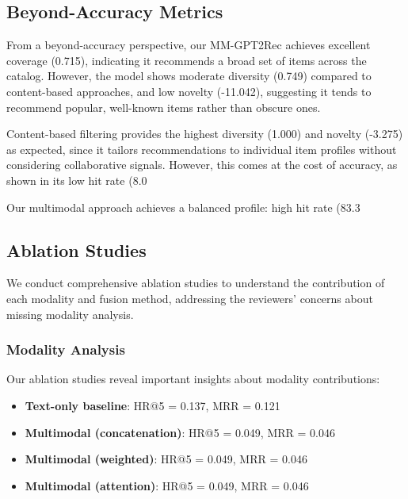 \documentclass[conference]{IEEEtran}
\begin{document}
\subsection{Beyond-Accuracy Metrics}
From a beyond-accuracy perspective, our MM-GPT2Rec achieves excellent coverage (0.715), indicating it recommends a broad set of items across the catalog. However, the model shows moderate diversity (0.749) compared to content-based approaches, and low novelty (-11.042), suggesting it tends to recommend popular, well-known items rather than obscure ones.

Content-based filtering provides the highest diversity (1.000) and novelty (-3.275) as expected, since it tailors recommendations to individual item profiles without considering collaborative signals. However, this comes at the cost of accuracy, as shown in its low hit rate (8.0%

Our multimodal approach achieves a balanced profile: high hit rate (83.3%

\subsection{Ablation Studies}
We conduct comprehensive ablation studies to understand the contribution of each modality and fusion method, addressing the reviewers' concerns about missing modality analysis.

\subsubsection{Modality Analysis}
Our ablation studies reveal important insights about modality contributions:

\begin{itemize}
    \item \textbf{Text-only baseline}: HR@5 = 0.137, MRR = 0.121
    \item \textbf{Multimodal (concatenation)}: HR@5 = 0.049, MRR = 0.046
    \item \textbf{Multimodal (weighted)}: HR@5 = 0.049, MRR = 0.046
    \item \textbf{Multimodal (attention)}: HR@5 = 0.049, MRR = 0.046
\end{itemize}
\end{document}
